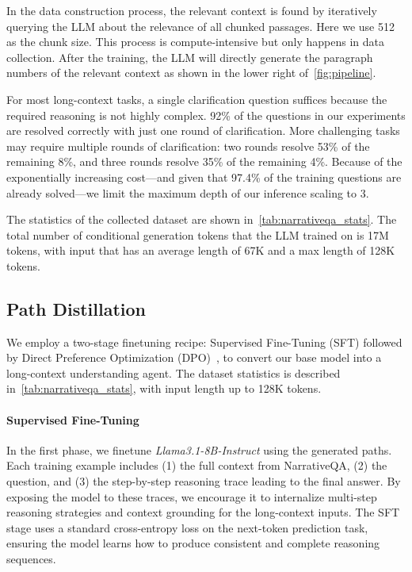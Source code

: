 In the data construction process, the relevant context is found by iteratively querying the LLM about the relevance of all chunked passages. Here we use 512 as the chunk size. This process is compute-intensive but only happens in data collection. 
After the training, the LLM will directly generate the paragraph numbers of the relevant context as shown in the lower right of~\cref{fig:pipeline}.

% 

For most long-context tasks, a single clarification question suffices because the required reasoning is not highly complex. 92\% of the questions in our experiments are resolved correctly with just one round of clarification. More challenging tasks may require multiple rounds of clarification: two rounds resolve 53\% of the remaining 8\%, and three rounds resolve 35\% of the remaining 4\%. Because of the exponentially increasing cost—and given that 97.4\% of the training questions are already solved—we limit the maximum depth of our inference scaling to 3.

The statistics of the collected dataset are shown in~\cref{tab:narrativeqa_stats}. The total number of conditional generation tokens that the LLM trained on is 17M tokens, with input that has an average length of 67K and a max length of 128K tokens.



\subsection{\coc Path Distillation}
We employ a two-stage finetuning recipe: Supervised Fine-Tuning (SFT) followed by Direct Preference Optimization (DPO)~\cite{rafailov2024direct}, to convert our base model into a long-context understanding agent.
The dataset statistics is described in~\cref{tab:narrativeqa_stats}, with input length up to 128K tokens. 

\paragraph{Supervised Fine-Tuning} In the first phase, we finetune \textit{Llama3.1-8B-Instruct} using the generated \coc paths. Each training example includes (1) the full context from NarrativeQA, (2) the question, and (3) the step-by-step reasoning trace leading to the final answer. 
By exposing the model to these traces, we encourage it to internalize multi-step reasoning strategies and context grounding for the long-context inputs. 
The SFT stage uses a standard cross-entropy loss on the next-token prediction task, ensuring the model learns how to produce consistent and complete reasoning sequences.

